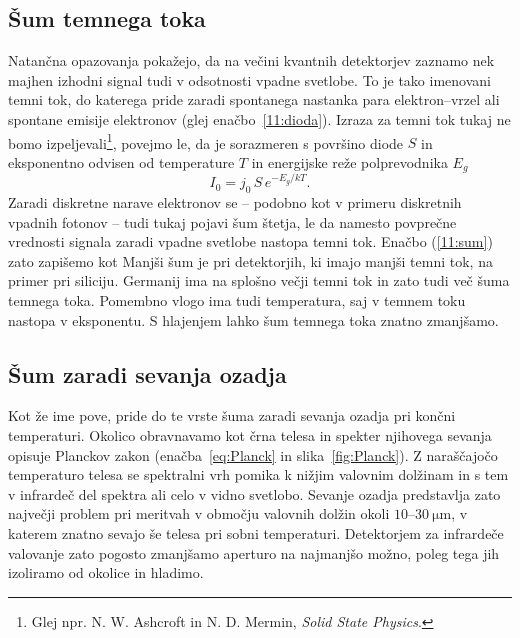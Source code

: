 \subsection*{Šum temnega toka} 
Natančna opazovanja pokažejo, da na večini kvantnih detektorjev zaznamo 
nek majhen izhodni signal tudi v odsotnosti vpadne svetlobe. 
To je tako imenovani temni tok, do katerega pride zaradi
spontanega nastanka para elektron--vrzel ali spontane emisije elektronov 
(glej enačbo~\ref{11:dioda}). Izraza za temni tok tukaj ne bomo 
izpeljevali\footnote{Glej npr. N. W. Ashcroft in N. D. Mermin, {\it Solid State Physics}.},
povejmo le, da je sorazmeren s površino diode $S$ in 
eksponentno odvisen od temperature $T$ in energijske reže polprevodnika $E_g$
\begin{equation}
I_0 = j_0\, S\, e^{-E_g/kT}.
\end{equation}
Zaradi diskretne narave elektronov se -- podobno
kot v primeru diskretnih vpadnih fotonov -- tudi tukaj pojavi šum štetja, le da 
namesto povprečne vrednosti signala zaradi vpadne svetlobe nastopa temni tok. 
Enačbo (\ref{11:sum}) zato zapišemo kot 
Manjši šum je pri detektorjih, ki imajo manjši temni tok, na primer pri siliciju.
Germanij  ima na splošno večji temni tok in zato tudi več šuma temnega toka. Pomembno
vlogo ima tudi temperatura, saj v temnem toku nastopa v eksponentu. S hlajenjem lahko 
šum temnega toka znatno zmanjšamo. 

\subsection*{Šum zaradi sevanja ozadja}
Kot že ime pove, pride do te vrste šuma zaradi sevanja ozadja pri končni temperaturi.
Okolico obravnavamo kot črna telesa 
in spekter njihovega sevanja opisuje Planckov 
zakon (enačba~\ref{eq:Planck} in slika~\ref{fig:Planck}). Z naraščajočo temperaturo telesa se 
spektralni vrh pomika k nižjim valovnim dolžinam in s tem 
v infrardeč del spektra ali celo v vidno svetlobo. 
Sevanje ozadja predstavlja zato največji problem pri meritvah v
območju valovnih dolžin okoli $10$--$30~\si{\micro\meter}$, v katerem znatno sevajo še telesa 
pri sobni temperaturi. Detektorjem za infrardeče valovanje zato pogosto zmanjšamo aperturo 
na najmanjšo možno, poleg tega jih izoliramo od okolice in hladimo. 

